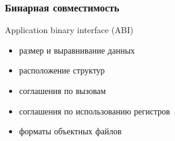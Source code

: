\begin{frame}[fragile]
	\frametitle{Бинарная совместимость}

	\begin{block}{Application binary interface (ABI)}
		\begin{itemize}
				\item размер и выравнивание данных
				\item расположение структур
				\item соглашения по вызовам
				\item соглашения по использованию регистров
				\item форматы объектных файлов
		\end{itemize}
	\end{block}
\end{frame}



